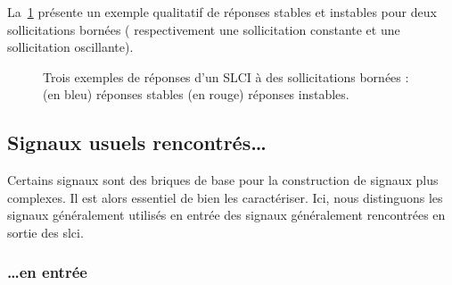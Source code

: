 La~\cref{fig-stabilite_signaux} présente un exemple qualitatif de réponses 
stables et instables pour deux sollicitations bornées ( respectivement une 
sollicitation constante et une sollicitation oscillante).
\begin{figure}[!ht]
    \centering
    
    
    

    
    
    
    \caption{Trois exemples de réponses d'un SLCI à des sollicitations bornées :
            (en bleu)  réponses stables 
            (en rouge) réponses instables.\label{fig-stabilite_signaux}}
\end{figure}
\newpage
{}
\captionsetup{width=0.9\linewidth}
\subsection{Signaux usuels rencontrés\ldots\label{sec-signaux_usuels}}
Certains signaux sont des briques de base pour la construction de
signaux plus complexes. Il est alors essentiel de bien les caractériser.
Ici, nous distinguons les signaux généralement utilisés en 
entrée des signaux généralement rencontrées en sortie des \gls{slci}.
\subsubsection{\ldots en entrée}
